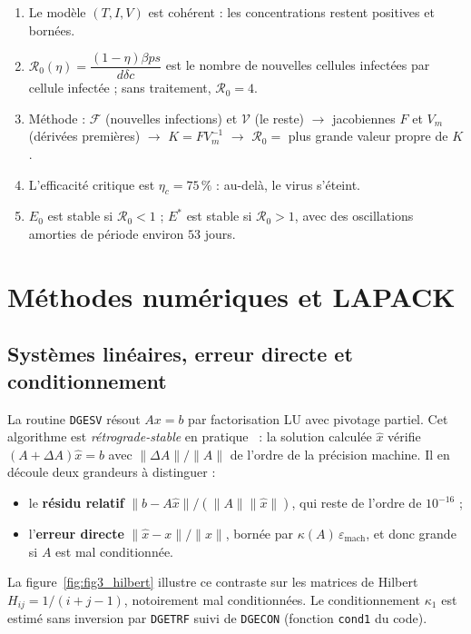 \documentclass[11pt,a4paper]{report}
\theoremstyle{plain}
\theoremstyle{definition}
\theoremstyle{remark}
\newcommand{\Rzero}{\mathcal{R}_0}
\begin{document}
\begin{encadreresume}
\begin{enumerate}
    \item Le modèle $(T,I,V)$ est cohérent : les concentrations restent positives et bornées.
    \item $\Rzero(\eta)=\dfrac{(1-\eta)\beta ps}{d\delta c}$ est le nombre de nouvelles cellules infectées par cellule infectée ; sans traitement, $\Rzero=4$.
    \item Méthode : $\mathcal F$ (nouvelles infections) et $\mathcal V$ (le reste) $\to$ jacobiennes $F$ et $V_m$ (dérivées premières) $\to$ $K=FV_m^{-1}$ $\to$ $\Rzero=$ plus grande valeur propre de $K$.
    \item L'efficacité critique est $\eta_c=75\,\%$ : au-delà, le virus s'éteint.
    \item $E_0$ est stable si $\Rzero<1$ ; $E^*$ est stable si $\Rzero>1$, avec des oscillations amorties de période environ $53$ jours.
\end{enumerate}
\end{encadreresume}

\chapter{Méthodes numériques et LAPACK}

\section{Systèmes linéaires, erreur directe et conditionnement}

La routine \texttt{DGESV} résout $Ax=b$ par factorisation LU avec pivotage partiel. Cet algorithme est \emph{rétrograde-stable} en pratique~\cite{higham2002} : la solution calculée $\hat x$ vérifie $(A+\Delta A)\hat x=b$ avec $\|\Delta A\|/\|A\|$ de l'ordre de la précision machine. Il en découle deux grandeurs à distinguer :
\begin{itemize}
    \item le \textbf{résidu relatif} $\|b-A\hat x\|/(\|A\|\|\hat x\|)$, qui reste de l'ordre de $10^{-16}$ ;
    \item l'\textbf{erreur directe} $\|\hat x-x\|/\|x\|$, bornée par $\kappa(A)\,\varepsilon_{\mathrm{mach}}$, et donc grande si $A$ est mal conditionnée.
\end{itemize}
La figure~\ref{fig:fig3_hilbert} illustre ce contraste sur les matrices de Hilbert $H_{ij}=1/(i+j-1)$, notoirement mal conditionnées. Le conditionnement $\kappa_1$ est estimé sans inversion par \texttt{DGETRF} suivi de \texttt{DGECON} (fonction \texttt{cond1} du code).
\end{document}
